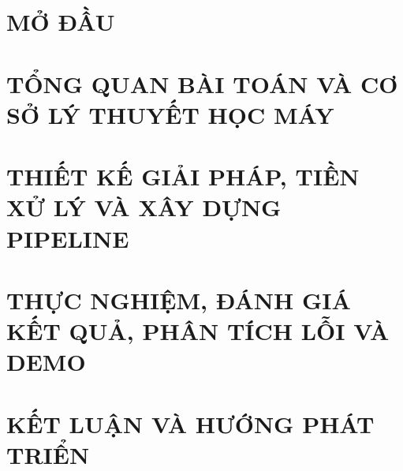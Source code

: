 \documentclass[a4paper,12pt,twoside]{extreport}
\begin{document}
\hfuzz=10pt
\vfuzz=10pt

\hypersetup{pageanchor=false}


\newpage

\newpage

\newpage


\newpage
\hypersetup{pageanchor=true}
\renewcommand*\contentsname{MỤC LỤC}
\tableofcontents
\newpage
\listoffigures
\newpage
\listoftables
\newpage


\newpage

\pagestyle{fancy}
\fancyhf{}
\fancyhead[RE, LO]{\leftmark}
\fancyfoot[RO, LE]{\thepage}

\chapter*{MỞ ĐẦU}


\chapter{TỔNG QUAN BÀI TOÁN VÀ CƠ SỞ LÝ THUYẾT HỌC MÁY}


\chapter{THIẾT KẾ GIẢI PHÁP, TIỀN XỬ LÝ VÀ XÂY DỰNG PIPELINE}


\chapter{THỰC NGHIỆM, ĐÁNH GIÁ KẾT QUẢ, PHÂN TÍCH LỖI VÀ DEMO}


\chapter{KẾT LUẬN VÀ HƯỚNG PHÁT TRIỂN}

\end{document}
